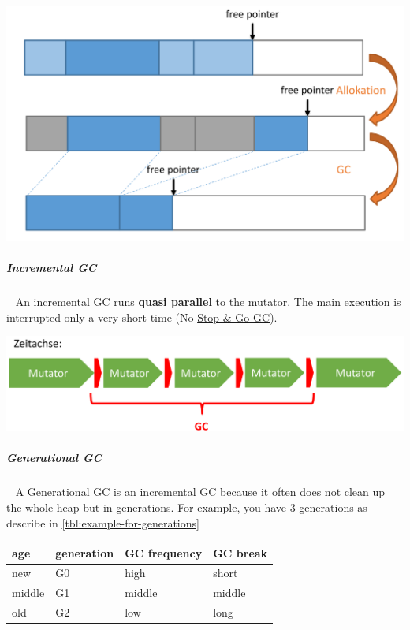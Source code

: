 \documentclass[11pt,twoside,landscape]{article}
\begin{document}
\begin{multicols}{3}
{
\begin{center}
\includegraphics[width=.9\linewidth]{img/compacting_gc.png}
\end{center}
\label{fig:compacting-gc-example}
}
\subparagraph{Incremental GC} \
\label{sec:orgbb42b1f}
An incremental GC runs \textbf{quasi parallel} to the mutator.
The main execution is interrupted only a very short time (No \href{../../../roam/20221230204307-when_is_the_garbage_collector_executed.org}{Stop \& Go GC}).


{
\begin{center}
\includegraphics[width=.9\linewidth]{img/incremental_gc.png}
\end{center}
\label{fig:incremental-gc}
}

\subparagraph{Generational GC} \
\label{sec:orgc3ace98}
A Generational GC is an incremental GC because it often does not clean up the whole heap but in generations.
For example, you have 3 generations as describe in \autoref{tbl:example-for-generations}

{
\begin{center}
\begin{tabular}{llll}
age & generation & GC frequency & GC break\\[0pt]
\hline
new & G0 & high & short\\[0pt]
middle & G1 & middle & middle\\[0pt]
old & G2 & low & long\\[0pt]
\end{tabular}
\end{center}
\label{tbl:example-for-generations}
}


\end{multicols}
\end{document}
